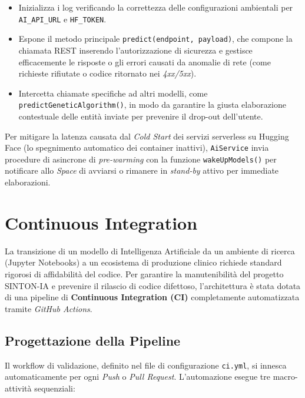 \begin{itemize}
    \item Inizializza i log verificando la correttezza delle configurazioni ambientali per \texttt{AI\_API\_URL} e \texttt{HF\_TOKEN}.
    \item Espone il metodo principale \texttt{predict(endpoint, payload)}, che compone la chiamata REST inserendo l'autorizzazione di sicurezza e gestisce efficacemente le risposte o gli errori causati da anomalie di rete (come richieste rifiutate o codice ritornato nei \textit{4xx/5xx}).
    \item Intercetta chiamate specifiche ad altri modelli, come \texttt{predictGeneticAlgorithm()}, in modo da garantire la giusta elaborazione contestuale delle entità inviate per prevenire il drop-out dell'utente.
\end{itemize}

Per mitigare la latenza causata dal \textit{Cold Start} dei servizi serverless su Hugging Face (lo spegnimento automatico dei container inattivi), \texttt{AiService} invia procedure di asincrone di \textit{pre-warming} con la funzione \texttt{wakeUpModels()} per notificare allo \textit{Space} di avviarsi o rimanere in \textit{stand-by} attivo per immediate elaborazioni.

\section{Continuous Integration}
\label{sec:continuous_integration}

La transizione di un modello di Intelligenza Artificiale da un ambiente di ricerca (Jupyter Notebooks) a un ecosistema di produzione clinico richiede standard rigorosi di affidabilità del codice. Per garantire la manutenibilità del progetto SINTON-IA e prevenire il rilascio di codice difettoso, l'architettura è stata dotata di una pipeline di \textbf{Continuous Integration (CI)} completamente automatizzata tramite \textit{GitHub Actions}.

\subsection{Progettazione della Pipeline}
Il workflow di validazione, definito nel file di configurazione \texttt{ci.yml}, si innesca automaticamente per ogni \textit{Push} o \textit{Pull Request}. L'automazione esegue tre macro-attività sequenziali:

